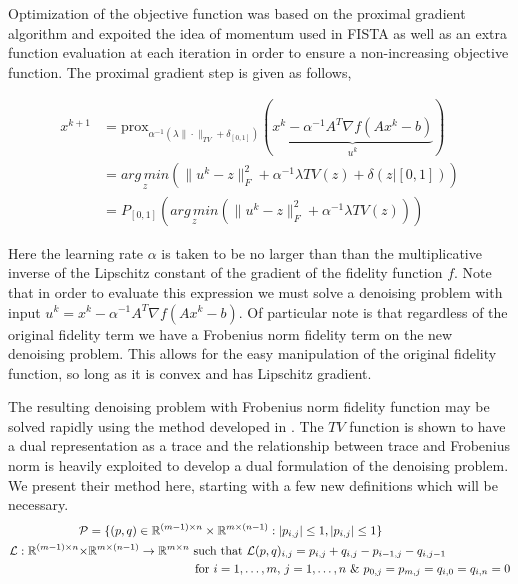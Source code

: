 \documentclass[10pt,a4paper]{article}
\newcommand{\prox}{\mathrm{prox}}
\newcommand{\R}{\mathbb{R}}
\newcommand{\AMz}{\underset{z}{arg\, min}}
\begin{document}
Optimization of the objective function was based on the proximal gradient algorithm and expoited the idea of momentum used in FISTA as well as an extra function evaluation at each iteration in order to ensure a non-increasing objective function.  The proximal gradient step is given as follows,

\begin{align*}
x^{k+1} &= \prox_{\alpha^{-1}(\lambda \|\cdot \|_{TV} + \delta_{[0,1]})} (\underbrace{x^k - \alpha^{-1} A^T\nabla f (Ax^k - b)}_{u^k}) \\
&= \AMz \left( \|u^k - z\|_F^2 + \alpha^{-1}\lambda TV(z) + \delta(z | [0,1]) \right) \\
&= P_{[0,1]}  \left( \AMz \left( \|u^k - z\|_F^2 + \alpha^{-1}\lambda TV(z) \right) \right)
\end{align*}

Here the learning rate $\alpha$ is taken to be no larger than than the multiplicative inverse of the Lipschitz constant of the gradient of the fidelity function $f$.  Note that in order to evaluate this expression we must solve a denoising problem with input $u^k = x^k - \alpha^{-1} A^T\nabla f (Ax^k - b)$.  Of particular note is that regardless of the original fidelity term we have a Frobenius norm fidelity term on the new denoising problem.  This allows for the easy manipulation of the original fidelity function, so long as it is convex and has Lipschitz gradient.

The resulting denoising problem with Frobenius norm fidelity function may be solved rapidly using the method developed in \cite{TV}.  The $TV$ function is shown to have a dual representation as a trace and the relationship between trace and Frobenius norm is heavily exploited to develop a dual formulation of the denoising problem.  We present their method here, starting with a few new definitions which will be necessary.
\begin{align*}
\mathcal{P} &= \{ (p,q) \in \R^{(m-1) \times n} \times \R^{ m \times (n-1) } :  \abs{p_{i,j} } \le 1, \abs{p_{ i,j } } \le 1 \} \\
 \mathcal{L} : \R^{(m-1) \times n} \times& \R^{ m \times (n-1) } \rightarrow \R^{m \times n}  \text{ such that } \mathcal{L}(p,q)_{i,j} = p_{i,j} + q_{i,j} - p_{ i-1,j } - q_{ i,j-1 }\\ &\hspace{3 cm} \text{ for } i = 1,\dots,m,\,j = 1,\dots,n \text{ \& }  p_{0,j} = p_{m,j} = q_{i,0} = q_{i,n} = 0\\
\end{align*}
\end{document}

